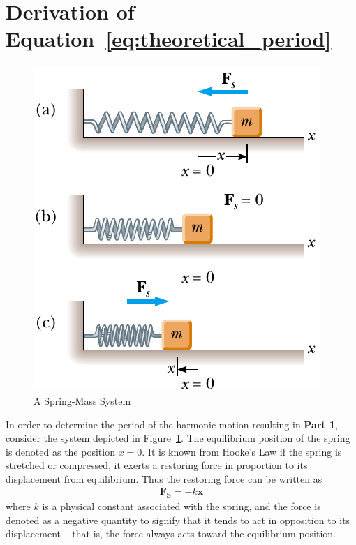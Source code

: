 \documentclass[twocolumn,english]{IEEEtran}
\theoremstyle{plain}
\theoremstyle{plain}
\begin{document}
\section{Derivation of Equation~\ref{eq:theoretical_period}}\label{append:period_deriv}

\begin{figure}[h!]
  \begin{centering}
  \begin{center}
  \includegraphics[width=\linewidth]{./Images/simple_pendulum.png}
  \caption{A Spring-Mass System}
  \label{fig:spring_mass}
  \end{center}
  \par\end{centering}
  \end{figure}

  In order to determine the period of the harmonic motion resulting in
  \textbf{Part 1}, consider the system depicted in Figure~\ref{fig:spring_mass}.
  The equilibrium position of the spring is denoted as the position $x=0$. It is known from Hooke's Law if the spring is stretched or compressed, it exerts a restoring force in proportion to its displacement from equilibrium. Thus the restoring force can be written as
  \begin{align*}
   \mathbf{F_S} = -k\mathbf{x}
  \end{align*}
  where $k$ is a physical constant associated with the spring, and the force is denoted as a negative quantity to signify that it tends to act in opposition to its displacement -- that is, the force always acts toward the equilibrium position.
\end{document}
